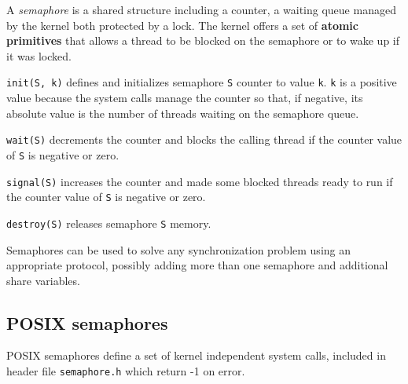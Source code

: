 A \emph{semaphore} is a shared structure including a counter, a waiting queue managed by the kernel both protected by a lock.
The kernel offers a set of \textbf{atomic primitives} that allows a thread to be blocked on the semaphore or to wake up if it was locked.

\begin{description}
\item \texttt{init(S, k)} defines and initializes semaphore \texttt{S} counter to value \texttt{k}. \texttt{k} is a positive value because the system calls manage the counter so that, if negative, its absolute value is the number of threads waiting on the semaphore queue.
\item \texttt{wait(S)} decrements the counter and blocks the calling thread if the counter value of \texttt{S} is negative or zero.
\item \texttt{signal(S)} increases the counter and made some blocked threads ready to run if the counter value of \texttt{S} is negative or zero.
\item \texttt{destroy(S)} releases semaphore \texttt{S} memory.
\end{description}

Semaphores can be used to solve any synchronization problem using an appropriate protocol, possibly adding more than one semaphore and additional share variables.

\subsection{POSIX semaphores}
POSIX semaphores define a set of kernel independent system calls, included in header file \texttt{semaphore.h} which return -1 on error.

